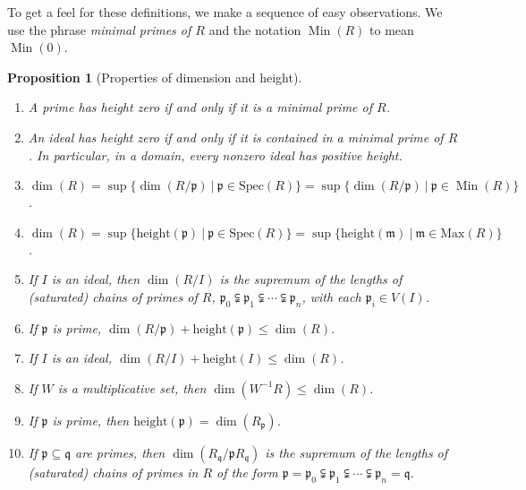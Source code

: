 \documentclass{amsart}[12pt]
\def\Min{\operatorname{Min}}
\newcommand{\p}{{\mathfrak p}}
\newcommand{\fm}{{\mathfrak m}}
\newcommand{\q}{{\mathfrak q}}
\numberwithin{equation}{section}
\theoremstyle{plain} %
\newtheorem{prop}[equation]{Proposition}
\theoremstyle{definition}
\theoremstyle{remark}
\newcommand{\Max}{\mathrm{Max}}
\newcommand{\Spec}{\mathrm{Spec}}
\begin{document}
To get a feel for these definitions, we make a sequence of easy observations. We use the phrase {\em minimal primes of $R$} and the notation $\Min(R)$  to mean $\Min(0)$.

\begin{prop}[Properties of dimension and height]
\label{rk:dimprop}
\

\begin{enumerate}
\item A prime has height zero if and only if it is a minimal prime of $R$.
\item An ideal has height zero if and only if it is contained in a minimal prime of $R$. In particular, in a domain, every nonzero ideal has positive height.
\item $\dim(R)=\sup\{ \dim(R/\p) \ | \ \p\in \Spec(R) \}=\sup\{ \dim(R/\p) \ | \ \p\in \Min(R) \}$.
\item $\dim(R)=\sup\{ \mathrm{height}(\p) \ | \ \p\in \Spec(R) \}=
\sup\{ \mathrm{height}(\fm) \ | \ \fm\in \Max(R) \}$.
	\item If $I$ is an ideal, then $\dim(R/I)$ is the supremum of the lengths of (saturated) chains of primes of $R$, $\p_0 \subsetneqq \p_1  \subsetneqq \cdots \subsetneqq \p_n$, with each $\p_i \in V(I)$.
	\item\label{ineq1} If $\p$ is prime, $\dim(R/\p) + \mathrm{height}(\p) \leq \dim(R)$.
	\item\label{ineq2} If $I$ is an ideal, $\dim(R/I) + \mathrm{height}(I) \leq \dim(R)$.
			\item If $W$ is a multiplicative set, then $\dim(W^{-1}R) \leq \dim(R)$.
\item If $\p$ is prime, then $\mathrm{height}(\p)=\dim(R_{\p})$.
\item If $\p\subseteq \q$ are primes, then $\dim(R_{\q}/ \p R_{\q})$ is the supremum of the lengths of (saturated) chains of primes in $R$ of the form 
	$\p=\p_0 \subsetneqq \p_1  \subsetneqq \cdots \subsetneqq \p_n=\q$.

\end{enumerate}
\end{prop}
\end{document}
